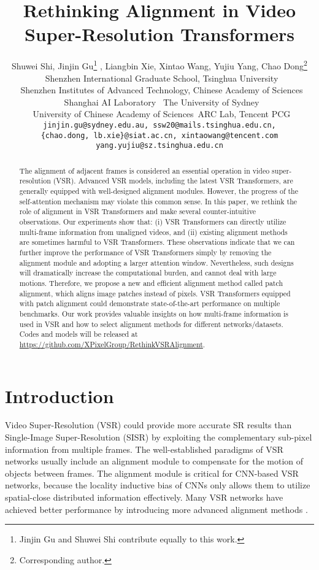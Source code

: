 \documentclass{article}
\title{Rethinking Alignment in Video Super-Resolution Transformers}
\author{Shuwei Shi, Jinjin Gu\thanks{Jinjin Gu and Shuwei Shi contribute equally to this work.} , Liangbin Xie, Xintao Wang, Yujiu Yang, Chao Dong\thanks{Corresponding author.}\\
  ~Shenzhen International Graduate School, Tsinghua University\\
  ~Shenzhen Institutes of Advanced Technology, Chinese Academy of Sciences\\
  ~Shanghai AI Laboratory\quad\quad
  ~The University of Sydney\\
  ~University of Chinese Academy of Sciences\quad\quad ~ARC Lab, Tencent PCG\\
  \texttt{jinjin.gu@sydney.edu.au, ssw20@mails.tsinghua.edu.cn,}\\
  \texttt{\{chao.dong, lb.xie\}@siat.ac.cn, xintaowang@tencent.com}\\
  \texttt{yang.yujiu@sz.tsinghua.edu.cn}\\
}
\begin{document}
\maketitle


\begin{abstract}
The alignment of adjacent frames is considered an essential operation in video super-resolution (VSR).
Advanced VSR models, including the latest VSR Transformers, are generally equipped with well-designed alignment modules.
However, the progress of the self-attention mechanism may violate this common sense.
In this paper, we rethink the role of alignment in VSR Transformers and make several counter-intuitive observations.
Our experiments show that:
(i) VSR Transformers can directly utilize multi-frame information from unaligned videos,
and (ii) existing alignment methods are sometimes harmful to VSR Transformers.
These observations indicate that we can further improve the performance of VSR Transformers simply by removing the alignment module and adopting a larger attention window.
Nevertheless, such designs will dramatically increase the computational burden, and cannot deal with large motions.
Therefore, we propose a new and efficient alignment method called patch alignment, which aligns image patches instead of pixels.
VSR Transformers equipped with patch alignment could demonstrate state-of-the-art performance on multiple benchmarks.
Our work provides valuable insights on how multi-frame information is used in VSR and how to select alignment methods for different networks/datasets.
Codes and models will be released at \url{https://github.com/XPixelGroup/RethinkVSRAlignment}.
\end{abstract}


\section{Introduction}
\label{sec:intro}
\vspace{-2mm}
Video Super-Resolution (VSR) could provide more accurate SR results than Single-Image Super-Resolution (SISR) by exploiting the complementary sub-pixel information from multiple frames. 
The well-established paradigms of VSR networks usually include an alignment module to compensate for the motion of objects between frames.
The alignment module is critical for CNN-based VSR networks, because the locality inductive bias of CNNs only allows them to utilize spatial-close distributed information effectively.
Many VSR networks have achieved better performance by introducing more advanced alignment methods \cite{wang2019edvr,chan2021basicvsr,tian2020tdan,liang2022recurrent}.
\end{document}
